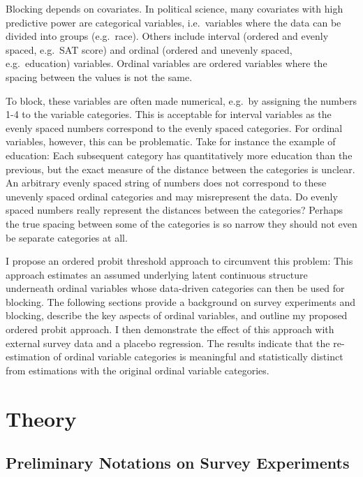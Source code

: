 \documentclass[12pt,econ]{sources/authesis}
\begin{document}
Blocking depends on covariates. In political science, many covariates with high predictive power are categorical variables, i.e.~variables where the data can be divided into groups (e.g.~race). Others include interval (ordered and evenly spaced, e.g.~SAT score) and ordinal (ordered and unevenly spaced, e.g.~education) variables. Ordinal variables are ordered variables where the spacing between the values is not the same.

To block, these variables are often made numerical, e.g.~by assigning the numbers 1-4 to the variable categories. This is acceptable for interval variables as the evenly spaced numbers correspond to the evenly spaced categories. For ordinal variables, however, this can be problematic. Take for instance the example of education: Each subsequent category has quantitatively more education than the previous, but the exact measure of the distance between the categories is unclear. An arbitrary evenly spaced string of numbers does not correspond to these unevenly spaced ordinal categories and may misrepresent the data. Do evenly spaced numbers really represent the distances between the categories? Perhaps the true spacing between some of the categories is so narrow they should not even be separate categories at all.

I propose an ordered probit threshold approach to circumvent this problem: This approach estimates an assumed underlying latent continuous structure underneath ordinal variables whose data-driven categories can then be used for blocking. The following sections provide a background on survey experiments and blocking, describe the key aspects of ordinal variables, and outline my proposed ordered probit approach. I then demonstrate the effect of this approach with external survey data and a placebo regression. The results indicate that the re-estimation of ordinal variable categories is meaningful and statistically distinct from estimations with the original ordinal variable categories.

\hypertarget{ordblock-theory}{%
\section{Theory}\label{ordblock-theory}}

\hypertarget{ordblock-theory-experiments}{%
\subsection{Preliminary Notations on Survey Experiments}\label{ordblock-theory-experiments}}
\end{document}
